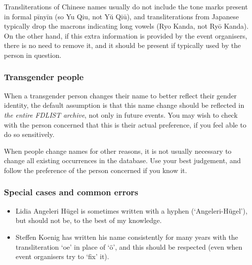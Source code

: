 \documentclass[12pt]{scrartcl}
\theoremstyle{definition}
\begin{document}
Transliterations of Chinese names usually do not include the tone marks present in formal pīnyīn (so Yu Qiu, not Yŭ Qiū), and transliterations from Japanese typically drop the macrons indicating long vowels (Ryo Kanda, not Ryō Kanda).
On the other hand, if this extra information is provided by the event organisers, there is no need to remove it, and it should be present if typically used by the person in question.

\subsubsection{Transgender people}
When a transgender person changes their name to better reflect their gender identity, the default assumption is that this name change should be reflected in \emph{the entire FDLIST archive}, not only in future events.
You may wish to check with the person concerned that this is their actual preference, if you feel able to do so sensitively.

When people change names for other reasons, it is not usually necessary to change all existing occurrences in the database.
Use your best judgement, and follow the preference of the person concerned if you know it.

\subsubsection{Special cases and common errors}
\begin{itemize}
\item Lidia Angeleri Hügel is sometimes written with a hyphen (`Angeleri-Hügel'), but should not be, to the best of my knowledge.
\item Steffen Koenig has written his name consistently for many years with the transliteration `oe' in place of `ö', and this should be respected (even when event organisers try to `fix' it).
\end{itemize}
\end{document}
